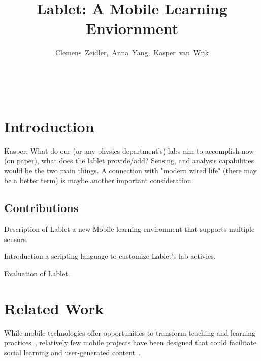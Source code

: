 \documentclass{sigchi}
\begin{document}
\title{Lablet: A Mobile Learning Enviornment}


\author{
	\alignauthor \mbox{Clemens Zeidler, Anna Yang, Kasper van Wijk}\\
		\\
		\\
		\\
}

\maketitle


\begin{abstract}

\end{abstract}





\section{Introduction}
Kasper: What do our (or any physics department's) labs aim to accomplish now (on paper), what does the lablet provide/add? Sensing, and analysis capabilities would be the two main things. A connection with "modern wired life" (there may be  a better term) is maybe another important consideration.

\subsection{Contributions}

\begin{itemize*}
\item Description of Lablet a new Mobile learning environment that supports multiple sensors.
\item Introduction a scripting language to customize Lablet's lab activies.
\item Evaluation of Lablet.
\end{itemize*}


\section{Related Work}
While mobile technologies offer opportunities to transform teaching and learning practices~\cite{karnad2014trends, Kukulska2010}, relatively few mobile projects have been designed that could facilitate social learning and user-generated content~\cite{Frohberg2009}.
\end{document}
